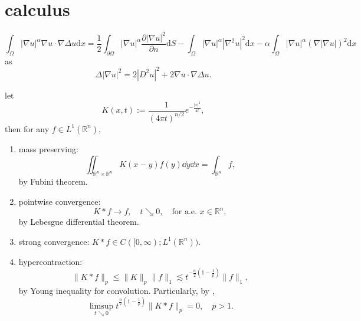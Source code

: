 \section{calculus}
\begin{equation}
	\int_\Omega |\nabla u|^\alpha \nabla u \cdot \nabla\Delta u\mathrm{d}x = \frac{1}{2}\int_{\partial \Omega} |\nabla u|^\alpha \frac{\partial |\nabla u|^2}{\partial n}\mathrm{d}S - \int_\Omega |\nabla u|^\alpha |\nabla^2u|^2\mathrm{d}x - \alpha \int_\Omega |\nabla u|^\alpha (\nabla |\nabla u|)^2\mathrm{d}x
\end{equation}
as \begin{equation}
	\nonumber
	\Delta|\nabla u|^2 = 2|D^2u|^2 + 2\nabla u \cdot \nabla \Delta u.
\end{equation}

\begin{proposition}
	let 
	\[
		K(x,t) := \frac{1}{(4\pi t)^{n/2}}e^{-\frac{|x|^2}{4t}},
	\]
	then for any $f\in L^1(\mathbb{R}^n)$,
	\begin{enumerate}
		\item mass preserving: 	
			\[
			\iint_{\mathbb R^n\times\mathbb R^n}K(x-y)f(y)\dd y\dd x 
			= \int_{\mathbb R^n}f,
			\]
			by Fubini theorem.
		\item pointwise convergence: 
		\[
		K*f\to f,\quad{t\searrow0},\quad\text{for a.e. } x\in\mathbb{R}^n,
		\]
		by Lebesgue differential theorem.
		\item strong convergence: $K*f\in C([0,\infty);L^1(\mathbb{R}^n))$.
		\item hypercontraction:
		\[
		\|K*f\|_p\leq \|K\|_p\|f\|_1\lesssim t^{-\frac{n}{2}\left(1-\frac1p\right)}\|f\|_1,
		\]
		by Young inequality for convolution.
		Particularly, by \cite{Giga1988},
		\begin{equation}\label{eq: giga1988}
			\limsup_{t\searrow0}t^{\frac{n}{2}\left(1-\frac1p\right)}\|K*f\|_p = 0,\quad p>1.
		\end{equation}
	\end{enumerate}
\end{proposition}
